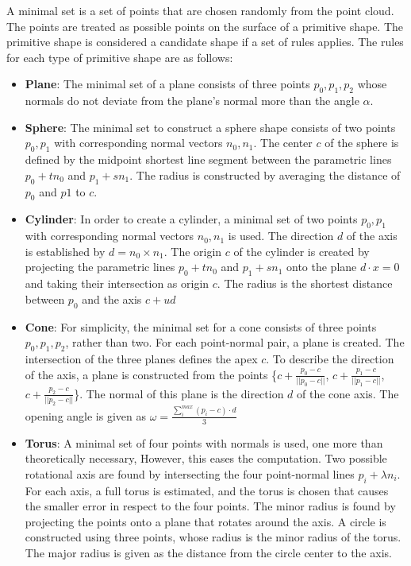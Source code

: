 A minimal set is a set of points that are chosen randomly from the point cloud. The points are treated as possible points on the surface of a primitive shape. The primitive shape is considered a candidate shape if a set of rules applies. The rules for each type of primitive shape are as follows: 

\begin{itemize}
    \item \textbf{Plane}: The minimal set of a plane consists of three points $p_0, p_1, p_2$ whose normals do not deviate from the plane's normal more than the angle $\alpha$. 
    
    \item \textbf{Sphere}: The minimal set to construct a sphere shape consists of two points $p_0, p_1$ with corresponding normal vectors $n_0, n_1$. The center $c$ of the sphere is defined by the midpoint shortest line segment between the parametric lines $p_0 + tn_0$ and $p_1 + sn_1$. The radius is constructed by averaging the distance of $p_0$ and $p1$ to $c$.

    \item \textbf{Cylinder}:
    In order to create a cylinder, a minimal set of two points  $p_0, p_1$ with corresponding normal vectors $n_0, n_1$ is used. The direction $d$ of the axis is established by $d = n_0 \times n_1$. The origin $c$ of the cylinder is created by projecting the parametric lines $p_0 + tn_0$ and $p_1 + sn_1$ onto the plane $d \cdot x = 0$ and taking their intersection as origin $c$. The radius is the shortest distance between $p_0$ and the axis $c + ud$
    
    \item \textbf{Cone}:
    For simplicity, the minimal set for a cone consists of three points $p_0, p_1, p_2$, rather than two. For each point-normal pair, a plane is created. The intersection of the three planes defines the apex $c$. To describe the direction of the axis, a plane is constructed from the points \{$c +  \frac{p_0 - c}{||p_0 - c||}$, $c +  \frac{p_1 - c}{||p_1 - c||}$, $c +  \frac{p_2 - c}{||p_2 - c||}$\}. The normal of this plane is the direction $d$ of the cone axis. The opening angle is given as $\omega = \frac{\sum_{i}^{max} (p_i - c)\cdot d}{3}$
    
    \item \textbf{Torus}:
    A minimal set of four points with normals is used, one more than theoretically necessary, However, this eases the computation.
    Two possible rotational axis are found by intersecting the four point-normal lines $p_i +  \lambda n_i$\cite{marshall2001robust}. For each axis, a full torus is estimated, and the torus is chosen that causes the smaller error in respect to the four points. The minor radius is found by projecting the points onto a plane that rotates around the axis. A circle is constructed using three points, whose radius is the minor radius of the torus. The major radius is given as the distance from the circle center to the axis. 



\end{itemize}
